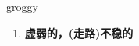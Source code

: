 
\begin{frame}
{\huge groggy}
\begin{center}
\begin{enumerate}\Large
  \item \textbf{虚弱的，(走路)不稳的}
\end{enumerate}
\end{center}
\end{frame}
